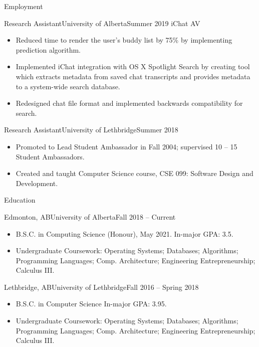 \documentclass[]{mcdowellcv}
\begin{document}
	\makeheader
	
	\begin{cvsection}{Employment}
		\begin{cvsubsection}{Research Assistant}{University of Alberta}{Summer 2019}
			iChat AV			
			\begin{itemize}
				\item Reduced time to render the user’s buddy list by 75\% by implementing prediction algorithm.
				\item Implemented iChat integration with OS X Spotlight Search by creating tool which extracts metadata from saved chat transcripts and provides metadata to a system-wide search database.
				\item Redesigned chat file format and implemented backwards compatibility for search.
			\end{itemize}
		\end{cvsubsection}
		
		\begin{cvsubsection}{Research Assistant}{University of Lethbridge}{Summer 2018}	
			\begin{itemize}
				\item Promoted to Lead Student Ambassador in Fall 2004; supervised 10 -- 15 Student Ambassadors.
				\item Created and taught Computer Science course, CSE 099: Software Design and Development.
			\end{itemize}
		\end{cvsubsection}
	\end{cvsection}
	
	\begin{cvsection}{Education}
		\begin{cvsubsection}{Edmonton, AB}{University of Alberta}{Fall 2018 -- Current}
			\begin{itemize}
                          \item B.S.C. in Computing Science (Honour), May 2021.  In-major GPA: 3.5.
				\item Undergraduate Coursework: Operating Systems; Databases; Algorithms; Programming Languages; Comp. Architecture; Engineering Entrepreneurship; Calculus III.
			\end{itemize}
		\end{cvsubsection}
                
                \begin{cvsubsection}{Lethbridge, AB}{University of Lethbridge}{Fall 2016 -- Spring 2018}
			\begin{itemize}
                          \item B.S.C. in Computer Science  In-major GPA: 3.95.
				\item Undergraduate Coursework: Operating Systems; Databases; Algorithms; Programming Languages; Comp. Architecture; Engineering Entrepreneurship; Calculus III.
			\end{itemize}
		\end{cvsubsection}\end{cvsection}
	
\end{document}
